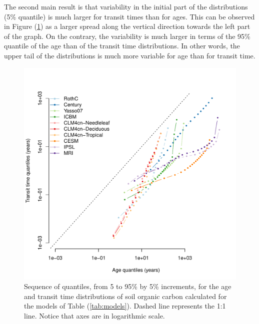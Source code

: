 \documentclass[draft,linenumbers]{agujournal}
\begin{document}
The second main result is that variability in the initial part of the distributions (5\% quantile) is much larger for transit times than for ages. This can be observed in Figure (\ref{fig:quantiles}) as a larger spread along the vertical direction towards the left part of the graph. On the contrary, the variability is much larger in terms of the 95\% quantile of the age than of the transit time distributions. In other words, the upper tail of the distributions is much more variable for age than for transit time. 


\begin{figure}[t]
   \centering
   \includegraphics[scale=0.75]{Figures/modelQ} %
   \caption{Sequence of quantiles, from 5 to 95\% by 5\% increments, for the age and transit time distributions of soil organic carbon calculated for the models of Table (\ref{tab:models}). Dashed line represents the 1:1 line. Notice that axes are in logarithmic scale.}
   \label{fig:quantiles}
\end{figure}
\end{document}
